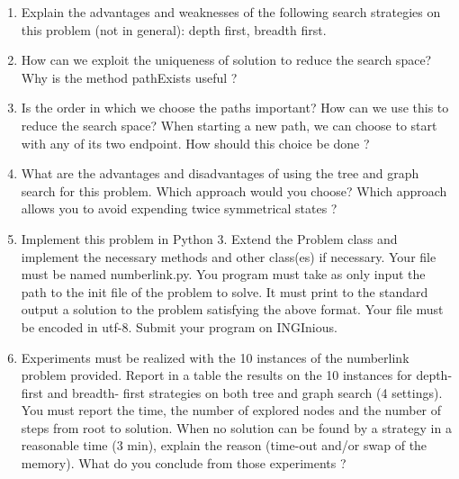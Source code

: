 \begin{enumerate}
    \item Explain the advantages and weaknesses of the following search
        strategies on this problem (not in general): depth first,
        breadth first.
    \item How can we exploit the uniqueness of solution to reduce the
        search space? Why is the method pathExists useful ?
    \item Is the order in which we choose the paths important? How can
        we use this to reduce the search space? When starting a new
        path, we can choose to start with any of its two endpoint. How
        should this choice be done ?
    \item What are the advantages and disadvantages of using the tree
        and graph search for this problem. Which approach would you
        choose? Which approach allows you to avoid expending twice
        symmetrical states ?
    \item Implement this problem in Python 3. Extend the Problem class
        and implement the necessary methods and other class(es) if
        necessary. Your file must be named numberlink.py. You program
        must take as only input the path to the init file of the problem
        to solve. It must print to the standard output a solution to the
        problem satisfying the above format. Your file must be encoded
        in utf-8. Submit your program on INGInious.
    \item Experiments must be realized with the 10 instances of the
        numberlink problem provided. Report in a table the results on
        the 10 instances for depth-first and breadth- first strategies
        on both tree and graph search (4 settings). You must report the
        time, the number of explored nodes and the number of steps from
        root to solution. When no solution can be found by a strategy in
        a reasonable time (3 min), explain the reason (time-out and/or
        swap of the memory). What do you conclude from those experiments
        ?
\end{enumerate}

